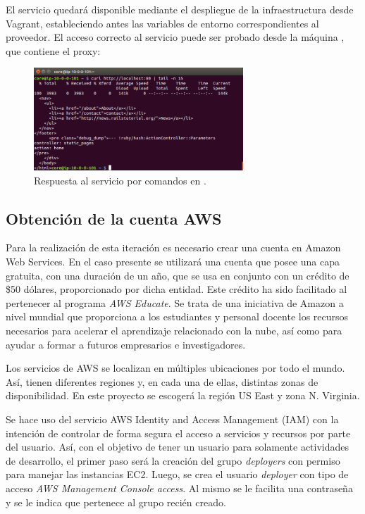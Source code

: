 El servicio quedará disponible mediante el despliegue de la infraestructura desde Vagrant, estableciendo antes las variables de entorno correspondientes al proveedor. El acceso correcto al servicio puede ser probado desde la máquina , que contiene el proxy:


\begin{figure}[H]
\centering
\includegraphics[width=0.7\textwidth]{images/figures/curl-confd.png}
\caption{Respuesta al servicio por comandos en .}
\end{figure}

\subsection{Obtención de la cuenta AWS}

Para la realización de esta iteración es necesario crear una cuenta en Amazon Web Services. En el caso presente se utilizará una cuenta que posee una capa gratuita, con una duración de un año, que se usa en conjunto con un crédito de \$50 dólares, proporcionado por dicha entidad. Este crédito ha sido facilitado al pertenecer al programa \textit{AWS Educate}. Se trata de una iniciativa de Amazon a nivel mundial que proporciona a los estudiantes y personal docente los recursos necesarios para acelerar el aprendizaje relacionado con la nube, así como para ayudar a formar a futuros empresarios e investigadores.

Los servicios de AWS se localizan en múltiples ubicaciones por todo el mundo. Así, tienen diferentes regiones y, en cada una de ellas, distintas zonas de disponibilidad. En este proyecto se escogerá la región US East y zona N. Virginia.

Se hace uso del servicio AWS Identity and Access Management (IAM) con la intención de controlar de forma segura el acceso a servicios y recursos por parte del usuario. Así, con el objetivo de tener un usuario para solamente actividades de desarrollo, el primer paso será la creación del grupo \textit{deployers} con permiso para manejar las instancias EC2. Luego, se crea el usuario \textit{deployer} con tipo de acceso \textit{AWS Management Console access}. Al mismo se le facilita una contraseña y se le indica que pertenece al grupo recién creado.

